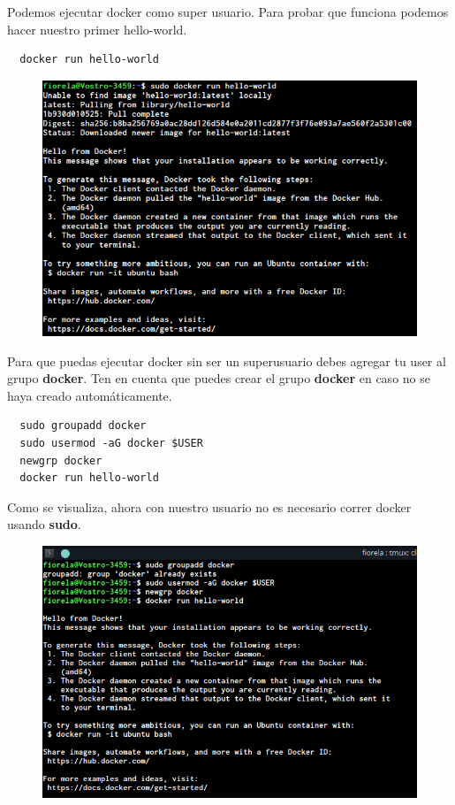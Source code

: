 \documentclass{article}
\begin{document}
Podemos ejecutar docker como super usuario. Para probar que funciona podemos
hacer nuestro primer hello-world.

\begin{verbatim}
  docker run hello-world
\end{verbatim}

\begin{figure}[h!]
  \centering
  \includegraphics[scale=0.75]{./Pictures/Devilbox/005_docker.png}
\end{figure}

Para que puedas ejecutar docker sin ser un superusuario debes agregar tu user
al grupo \textbf{docker}. Ten en cuenta que puedes crear el grupo
\textbf{docker} en caso no se haya creado automáticamente.\\

\begin{verbatim}
  sudo groupadd docker
  sudo usermod -aG docker $USER
  newgrp docker
  docker run hello-world
\end{verbatim}

Como se visualiza, ahora con nuestro usuario no es necesario correr docker
usando \textbf{sudo}.\\

\begin{figure}[h!]
  \centering
  \includegraphics[scale=0.75]{./Pictures/Devilbox/006_docker_user.png}
\end{figure}
\end{document}
